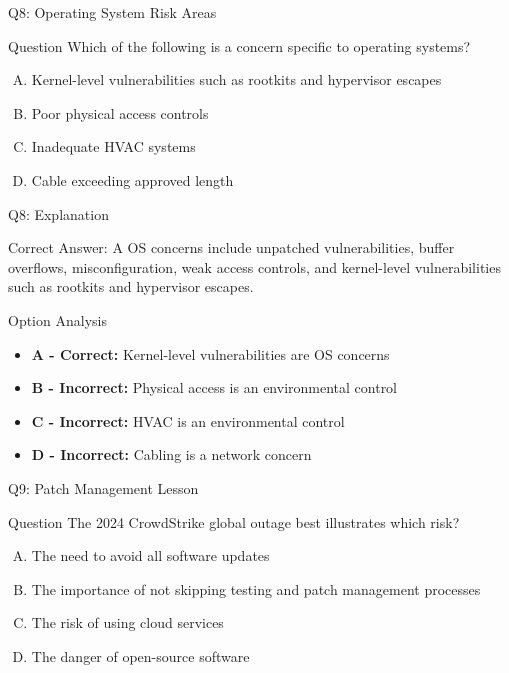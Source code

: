 \documentclass{beamer}
\begin{document}
	\begin{frame}{Q8: Operating System Risk Areas}
		\begin{block}{Question}
			Which of the following is a concern specific to operating systems?
		\end{block}
		\begin{enumerate}[(A)]
			\item Kernel-level vulnerabilities such as rootkits and hypervisor escapes
			\item Poor physical access controls
			\item Inadequate HVAC systems
			\item Cable exceeding approved length
		\end{enumerate}
	\end{frame}
	
	\begin{frame}{Q8: Explanation}
		\begin{block}{Correct Answer: A}
			OS concerns include unpatched vulnerabilities, buffer overflows, misconfiguration, weak access controls, and kernel-level vulnerabilities such as rootkits and hypervisor escapes.
		\end{block}
		\begin{block}{Option Analysis}
			\begin{itemize}
				\item \textbf{A - Correct:} Kernel-level vulnerabilities are OS concerns
				\item \textbf{B - Incorrect:} Physical access is an environmental control
				\item \textbf{C - Incorrect:} HVAC is an environmental control
				\item \textbf{D - Incorrect:} Cabling is a network concern
			\end{itemize}
		\end{block}
	\end{frame}
	
	\begin{frame}{Q9: Patch Management Lesson}
		\begin{block}{Question}
			The 2024 CrowdStrike global outage best illustrates which risk?
		\end{block}
		\begin{enumerate}[(A)]
			\item The need to avoid all software updates
			\item The importance of not skipping testing and patch management processes
			\item The risk of using cloud services
			\item The danger of open-source software
		\end{enumerate}
	\end{frame}
	
\end{document}
